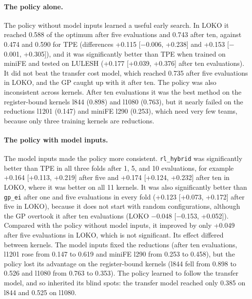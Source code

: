 \documentclass[10pt]{article}
\newcommand{\code}[1]{\texttt{#1}}
\begin{document}
\paragraph{The policy alone.} The policy without model inputs learned a
useful early search. In LOKO it reached 0.588 of the optimum after five
evaluations and 0.743 after ten, against 0.474 and 0.590 for TPE (differences
+0.115 [$-$0.006, +0.238] and +0.153 [$-$0.001, +0.305]), and it was
significantly better than TPE when trained on miniFE and tested on LULESH
(+0.177 [+0.039, +0.376] after ten evaluations). It did not beat the transfer
cost model, which reached 0.735 after five evaluations in LOKO, and the GP
caught up with it after ten. The policy was also inconsistent across kernels.
After ten evaluations it was the best method on the register-bound kernels
l844 (0.898) and l1080 (0.763), but it nearly failed on the reductions l1201
(0.147) and miniFE l290 (0.253), which need very few teams, because only
three training kernels are reductions.

\paragraph{The policy with model inputs.} The model inputs made the policy
more consistent. \code{rl\_hybrid} was significantly better than TPE in all
three folds after 1, 5, and 10 evaluations, for example +0.164 [+0.113,
+0.219] after five and +0.174 [+0.124, +0.232] after ten in LOKO, where it was
better on all 11 kernels. It was also significantly better than
\code{gp\_ei} after one and five evaluations in every fold (+0.123 [+0.073,
+0.172] after five in LOKO), because it does not start with random
configurations, although the GP overtook it after ten evaluations (LOKO
$-$0.048 [$-$0.153, +0.052]). Compared with the policy without model inputs,
it improved by only +0.049 after five evaluations in LOKO, which is not
significant. Its effect differed between kernels. The model inputs fixed the
reductions (after ten evaluations, l1201 rose from 0.147 to 0.619 and miniFE
l290 from 0.253 to 0.458), but the policy lost its advantage on the
register-bound kernels (l844 fell from 0.898 to 0.526 and l1080 from 0.763 to
0.353). The policy learned to follow the transfer model, and so inherited its
blind spots: the transfer model reached only 0.385 on l844 and 0.525 on l1080.
\end{document}
